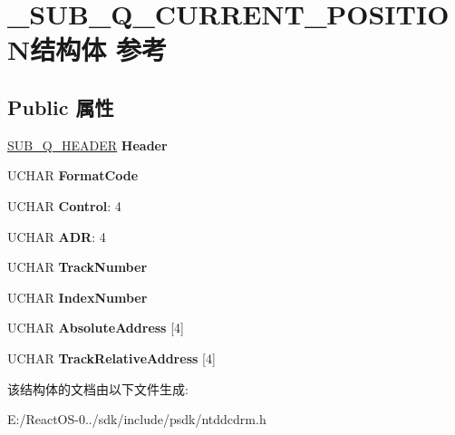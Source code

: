 \hypertarget{struct___s_u_b___q___c_u_r_r_e_n_t___p_o_s_i_t_i_o_n}{}\section{\+\_\+\+S\+U\+B\+\_\+\+Q\+\_\+\+C\+U\+R\+R\+E\+N\+T\+\_\+\+P\+O\+S\+I\+T\+I\+O\+N结构体 参考}
\label{struct___s_u_b___q___c_u_r_r_e_n_t___p_o_s_i_t_i_o_n}
\subsection*{Public 属性}
\begin{DoxyCompactItemize}
\item 
\mbox{\label{struct___s_u_b___q___c_u_r_r_e_n_t___p_o_s_i_t_i_o_n_af095f8bd25d4de762403d989cde7373a}} 
\hyperlink{struct___s_u_b___q___h_e_a_d_e_r}{S\+U\+B\+\_\+\+Q\+\_\+\+H\+E\+A\+D\+ER} {\bfseries Header}
\item 
\mbox{\label{struct___s_u_b___q___c_u_r_r_e_n_t___p_o_s_i_t_i_o_n_adaa6723001bfe86db00eeb721d16b99e}} 
U\+C\+H\+AR {\bfseries Format\+Code}
\item 
\mbox{\label{struct___s_u_b___q___c_u_r_r_e_n_t___p_o_s_i_t_i_o_n_a003ff1296a868e119d33a61075b99da5}} 
U\+C\+H\+AR {\bfseries Control}\+: 4
\item 
\mbox{\label{struct___s_u_b___q___c_u_r_r_e_n_t___p_o_s_i_t_i_o_n_a6c9235bef392702592aa264e9b2cf6de}} 
U\+C\+H\+AR {\bfseries A\+DR}\+: 4
\item 
\mbox{\label{struct___s_u_b___q___c_u_r_r_e_n_t___p_o_s_i_t_i_o_n_aed1b6b4e10e2c3e04ee0d3022f8f67fa}} 
U\+C\+H\+AR {\bfseries Track\+Number}
\item 
\mbox{\label{struct___s_u_b___q___c_u_r_r_e_n_t___p_o_s_i_t_i_o_n_a8fa05b12980304b5573251e48c0dacdb}} 
U\+C\+H\+AR {\bfseries Index\+Number}
\item 
\mbox{\label{struct___s_u_b___q___c_u_r_r_e_n_t___p_o_s_i_t_i_o_n_acc025c45c115df77298154cfa12fbd93}} 
U\+C\+H\+AR {\bfseries Absolute\+Address} \mbox{[}4\mbox{]}
\item 
\mbox{\label{struct___s_u_b___q___c_u_r_r_e_n_t___p_o_s_i_t_i_o_n_a609be2e4d09cb7e70263f92ac7b8f65b}} 
U\+C\+H\+AR {\bfseries Track\+Relative\+Address} \mbox{[}4\mbox{]}
\end{DoxyCompactItemize}


该结构体的文档由以下文件生成\+:\begin{DoxyCompactItemize}
\item 
E\+:/\+React\+O\+S-\/0../sdk/include/psdk/ntddcdrm.\+h\end{DoxyCompactItemize}
